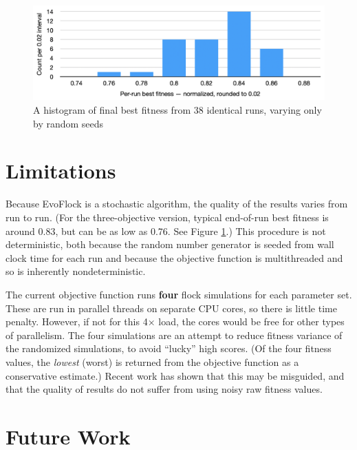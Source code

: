 \documentclass[letterpaper]{article}
\begin{document}

\begin{figure}[]
    \centering
    \includegraphics[width=0.9\linewidth]{images/temp_seed_variance.png}
    \caption{A histogram of final best fitness from 38 identical runs, varying only by random seeds}
    \label{fig:seed_variance}
\end{figure}


\section{Limitations}
\label{sec:limitations}

Because EvoFlock is a stochastic algorithm, the quality of the results varies from run to run. (For the three-objective version, typical end-of-run best fitness is around 0.83, but can be as low as 0.76. See Figure \ref{fig:seed_variance}.) This procedure is not deterministic, both because the random number generator is seeded from wall clock time for each run and because the objective function is multithreaded and so is inherently nondeterministic.

The current objective function runs \textbf{four} flock simulations for each parameter set. These are run in parallel threads on separate CPU cores, so there is little time penalty. However, if not for this 4{$\times$} load, the cores would be free for other types of parallelism. The four simulations are an attempt to reduce fitness variance of the randomized simulations, to avoid ``lucky'' high scores. (Of the four fitness values, the \textit{lowest} (worst) is returned from the objective function as a conservative estimate.) Recent work \citep{antipov_evolutionary_2025} has shown that this may be misguided, and that the quality of results do not suffer from using noisy raw fitness values.

\section{Future Work}
\label{sec:future}
\end{document}
